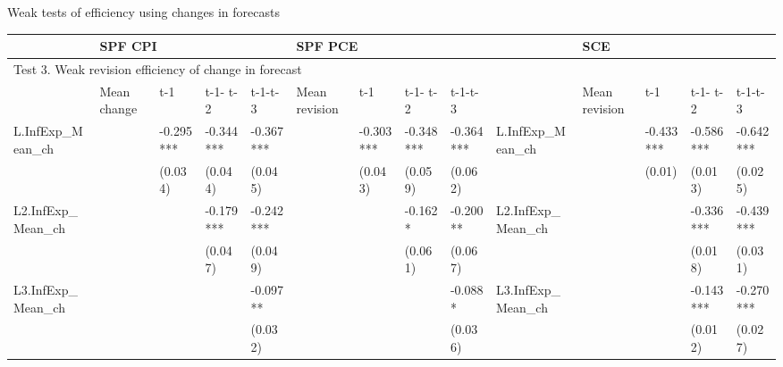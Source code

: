 \documentclass{beamer}
\begin{document}
\begin{frame}{Weak tests of efficiency using changes in forecasts }

	\begin{adjustbox}{width=\textwidth}
	\begin{threeparttable}
		\caption{Weak Tests of Revision Efficiency using Change in Forecasts and Uncertainty}
		\label{MeanWeakRevEfficiency}
		\begin{tabular}{llllllllllllll}
			\hline 
			& \multicolumn{4}{l}{SPF CPI}                     & \multicolumn{4}{l}{SPF PCE}                       &                      & \multicolumn{4}{l}{SCE}                           \\
			\hline 
			\multicolumn{14}{l}{Test 3. Weak revision efficiency of change in forecast}                                                                                                                                    \\
			\hline 
			& Mean change & t-1       & t-1- t-2  & t-1-t-3   & Mean revision & t-1       & t-1- t-2  & t-1-t-3   &                      & Mean revision & t-1       & t-1- t-2  & t-1-t-3   \\
			\hline 
			L.InfExp\_Mean\_ch   &             & -0.295*** & -0.344*** & -0.367*** &               & -0.303*** & -0.348*** & -0.364*** & L.InfExp\_Mean\_ch  &         & -0.433*** & -0.586*** & -0.642*** \\
			&             & (0.034)   & (0.044)   & (0.045)   &               & (0.043)   & (0.059)   & (0.062)   &                    &         & (0.01)     & (0.013)    & (0.025)    \\
			
			L2.InfExp\_Mean\_ch  &             &           & -0.179*** & -0.242*** &               &           & -0.162*   & -0.200**  & L2.InfExp\_Mean\_ch &         &           & -0.336*** & -0.439*** \\
			
			&             &           & (0.047)   & (0.049)   &               &           & (0.061)   & (0.067)   &                                   &         &           & (0.018)    & (0.031)    \\
			L3.InfExp\_Mean\_ch  &             &           &           & -0.097**  &               &           &           & -0.088*   & L3.InfExp\_Mean\_ch &         &           & -0.143*** & -0.270*** \\
			
			&             &           &           & (0.032)   &               &           &           & (0.036)   &                                &         &           & (0.012)    & (0.027)    \\
			

\end{tabular}
\end{threeparttable}
\end{adjustbox}
\end{frame}
\end{document}
